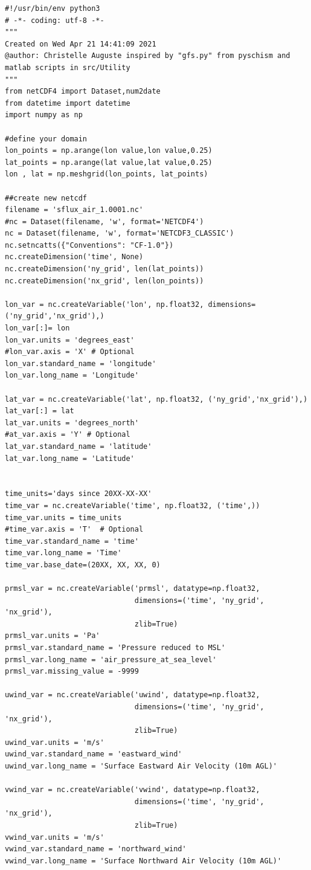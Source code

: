 \documentclass[preprints,briefreport,accept,oneauthor,pdftex]{Definitions/mdpi}
\begin{document}
\begin{verbatim}
#!/usr/bin/env python3
# -*- coding: utf-8 -*-
"""
Created on Wed Apr 21 14:41:09 2021
@author: Christelle Auguste inspired by "gfs.py" from pyschism and matlab scripts in src/Utility
"""
from netCDF4 import Dataset,num2date
from datetime import datetime
import numpy as np

#define your domain
lon_points = np.arange(lon value,lon value,0.25)
lat_points = np.arange(lat value,lat value,0.25)
lon , lat = np.meshgrid(lon_points, lat_points)

##create new netcdf
filename = 'sflux_air_1.0001.nc'
#nc = Dataset(filename, 'w', format='NETCDF4')
nc = Dataset(filename, 'w', format='NETCDF3_CLASSIC')
nc.setncatts({"Conventions": "CF-1.0"})
nc.createDimension('time', None)
nc.createDimension('ny_grid', len(lat_points)) 
nc.createDimension('nx_grid', len(lon_points)) 

lon_var = nc.createVariable('lon', np.float32, dimensions=('ny_grid','nx_grid'),)
lon_var[:]= lon
lon_var.units = 'degrees_east'
#lon_var.axis = 'X' # Optional
lon_var.standard_name = 'longitude'
lon_var.long_name = 'Longitude'

lat_var = nc.createVariable('lat', np.float32, ('ny_grid','nx_grid'),)
lat_var[:] = lat
lat_var.units = 'degrees_north'
#at_var.axis = 'Y' # Optional
lat_var.standard_name = 'latitude'
lat_var.long_name = 'Latitude'


time_units='days since 20XX-XX-XX'
time_var = nc.createVariable('time', np.float32, ('time',))
time_var.units = time_units
#time_var.axis = 'T'  # Optional
time_var.standard_name = 'time' 
time_var.long_name = 'Time'
time_var.base_date=(20XX, XX, XX, 0)

prmsl_var = nc.createVariable('prmsl', datatype=np.float32,
                              dimensions=('time', 'ny_grid', 'nx_grid'),
                              zlib=True)
prmsl_var.units = 'Pa'
prmsl_var.standard_name = 'Pressure reduced to MSL'
prmsl_var.long_name = 'air_pressure_at_sea_level'
prmsl_var.missing_value = -9999

uwind_var = nc.createVariable('uwind', datatype=np.float32,
                              dimensions=('time', 'ny_grid', 'nx_grid'),
                              zlib=True)
uwind_var.units = 'm/s'
uwind_var.standard_name = 'eastward_wind'
uwind_var.long_name = 'Surface Eastward Air Velocity (10m AGL)'

vwind_var = nc.createVariable('vwind', datatype=np.float32,
                              dimensions=('time', 'ny_grid', 'nx_grid'),
                              zlib=True)
vwind_var.units = 'm/s'
vwind_var.standard_name = 'northward_wind'
vwind_var.long_name = 'Surface Northward Air Velocity (10m AGL)'


\end{verbatim}
\end{document}

